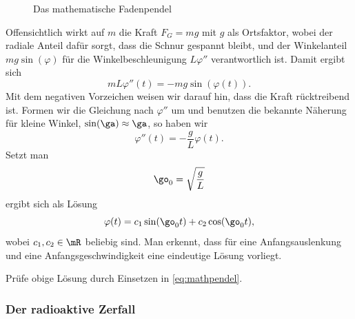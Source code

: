 \documentclass[%
draft,
11pt,%
twoside,%
titlepage,%
german,%
headsepline%
]{scrartcl}
\begin{document}
\begin{figure}
\begin{center}
\end{center}
\caption{Das mathematische Fadenpendel}
\end{figure}

Offensichtlich wirkt auf $m$ die Kraft $F_G=mg$ mit $g$ als Ortsfaktor, wobei der radiale Anteil daf\"ur sorgt, dass die Schnur gespannt bleibt, und der Winkelanteil $mg\sin(\varphi)$ f\"ur die Winkelbeschleunigung $L\varphi''$ verantwortlich ist. Damit ergibt sich
$$mL\varphi''(t)=-mg\sin(\varphi(t)).$$
Mit dem negativen Vorzeichen weisen wir darauf hin, dass die Kraft r\"ucktreibend ist. Formen wir die Gleichung nach $\varphi''$ um und benutzen die bekannte N\"aherung f\"ur kleine Winkel, $\sin(\ga)\approx\ga$, so haben wir
\begin{equation}\label{eq:mathpendel}
\varphi''(t)=-\frac{g}{L}\varphi(t).
\end{equation}
Setzt man
$$\go_0=\sqrt{\frac{g}{L}}$$
ergibt sich als L\"osung
$$\varphi(t)=c_1\sin(\go_0 t)+c_2\cos(\go_0 t),$$
wobei $c_1,c_2\in\mR$ beliebig sind.
Man erkennt, dass f\"ur eine Anfangsauslenkung und eine Anfangsgeschwindigkeit eine eindeutige L\"osung vorliegt.

\begin{ueb}
Pr\"ufe obige L\"osung durch Einsetzen in \eqref{eq:mathpendel}.
\end{ueb}

\subsubsection{Der radioaktive Zerfall}
\end{document}

